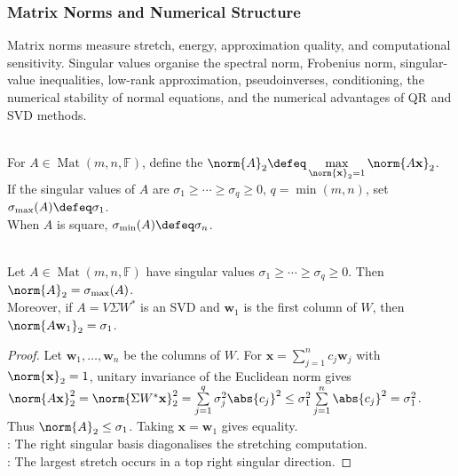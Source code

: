 \subsubsection{Matrix Norms and Numerical Structure}

Matrix norms measure stretch, energy, approximation quality, and computational sensitivity. Singular values organise the spectral norm, Frobenius norm, singular-value inequalities, low-rank approximation, pseudoinverses, conditioning, the numerical stability of normal equations, and the numerical advantages of QR and SVD methods.

\begin{definition} \label{def:spectral-norm-and-singular-extremes} \\
For $A\in\operatorname{Mat}(m,n,\mathbb{F})$, define the  $\norm{A}_2\defeq\max\limits_{\norm{\mathbf{x}}_2=1}\norm{A\mathbf{x}}_2$.\\
If the singular values of $A$ are $\sigma_1\geq\cdots\geq\sigma_q\geq0$, $q=\min(m,n)$, set $\sigma_{\max}(A)\defeq\sigma_1$.\\
When $A$ is square, $\sigma_{\min}(A)\defeq\sigma_n$.
\end{definition}

\begin{theorem} \label{thm:spectral-norm-largest-singular-value} \\
Let $A\in\operatorname{Mat}(m,n,\mathbb{F})$ have singular values $\sigma_1\geq\cdots\geq\sigma_q\geq0$. Then $\norm{A}_2=\sigma_{\max}(A)$.\\
Moreover, if $A=V\Sigma W^*$ is an SVD and $\mathbf{w}_1$ is the first column of $W$, then $\norm{A\mathbf{w}_1}_2=\sigma_1$.
\begin{proof}
Let $\mathbf{w}_1,\ldots,\mathbf{w}_n$ be the columns of $W$. For $\mathbf{x}=\sum_{j=1}^{n}c_j\mathbf{w}_j$ with $\norm{\mathbf{x}}_2=1$, unitary invariance of the Euclidean norm gives $\norm{A\mathbf{x}}_2^2 =\norm{\Sigma W^*\mathbf{x}}_2^2 =\sum\limits_{j=1}^{q}\sigma_j^2\abs{c_j}^2 \leq \sigma_1^2\sum\limits_{j=1}^{n}\abs{c_j}^2 =\sigma_1^2$.\\
Thus $\norm{A}_2\leq\sigma_1$. Taking $\mathbf{x}=\mathbf{w}_1$ gives equality.\\
: The right singular basis diagonalises the stretching computation.\\
: The largest stretch occurs in a top right singular direction.
\end{proof}
\end{theorem}

